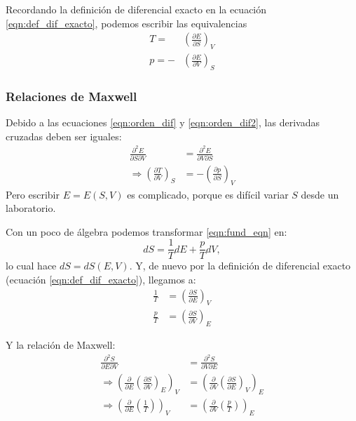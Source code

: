 \documentclass[]{article}
\numberwithin{equation}{section}
\newcommand{\0}{\textcolor{gray}{0}}
\begin{document}
Recordando la definición de diferencial exacto en la ecuación \ref{eqn:def_dif_exacto}, podemos escribir las equivalencias
\begin{align}
	T = &\left(\frac{\partial E}{\partial S}\right)_V\\
	p = -&\left(\frac{\partial E}{\partial V}\right)_S
\end{align}

\subsubsection{Relaciones de Maxwell}
Debido a las ecuaciones \ref{eqn:orden_dif} y \ref{eqn:orden_dif2}, las derivadas cruzadas deben ser iguales:
\begin{align}
	\frac{\partial^2E}{\partial S\partial V} &= \frac{\partial^2E}{\partial V\partial S}\nonumber\\
	\Rightarrow \left(\frac{\partial T}{\partial V}\right)_S &= -\left(\frac{\partial p}{\partial S}\right)_V \label{eqn:maxwell_rel1}
\end{align}
Pero escribir $E=E(S,V)$ es complicado, porque es difícil variar $S$ desde un laboratorio.

Con un poco de álgebra podemos transformar \ref{eqn:fund_eqn} en:
\begin{equation}
	dS = \frac{1}{T}dE + \frac{p}{T}dV,
\end{equation}
lo cual hace $dS=dS(E,V)$. Y, de nuevo por la definición de diferencial exacto (ecuación \ref{eqn:def_dif_exacto}), llegamos a:
\begin{align}
	\frac{1}{T} &= \left(\frac{\partial S}{\partial E}\right)_V\\
	\frac{p}{T} &= \left(\frac{\partial S}{\partial V}\right)_E
\end{align}

Y la relación de Maxwell:
\begin{align}
	\frac{\partial^2S}{\partial E\partial V} &= \frac{\partial^2S}{\partial V\partial E}\nonumber\\
	\Rightarrow \left( \frac{\partial}{\partial E}\left(\frac{\partial S}{\partial V}\right)_E\right)_V &= \left( \frac{\partial}{\partial V}\left(\frac{\partial S}{\partial E}\right)_V\right)_E \nonumber\\
	\Rightarrow \left( \frac{\partial}{\partial E}\left(\frac{1}{T}\right)\right)_V &= \left( \frac{\partial}{\partial V}\left(\frac{p}{T}\right)\right)_E \label{eqn:maxwell_rel2}
\end{align}
\end{document}
